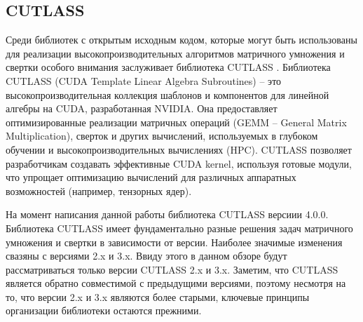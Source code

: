 \subsection{CUTLASS}
Среди библиотек с открытым исходным кодом, которые могут быть использованы для реализации высокопроизводительных алгоритмов матричного умножения
и свертки особого внимания заслуживает библиотека CUTLASS \cite{cutlass_2025}.
Библиотека CUTLASS (CUDA Template Linear Algebra Subroutines) – это высокопроизводительная коллекция шаблонов и компонентов
для линейной алгебры на CUDA, разработанная NVIDIA. Она предоставляет оптимизированные реализации матричных операций
(GEMM – General Matrix Multiplication), сверток и других вычислений, используемых в глубоком обучении и
высокопроизводительных вычислениях (HPC). CU\-TLASS позволяет разработчикам создавать эффективные CUDA kernel,
используя готовые модули, что упрощает оптимизацию вычислений для различных аппаратных возможностей (например, тензорных ядер).

На момент написания данной работы библиотека CUTLASS версиии 4.0.0. Библиотека CUTLASS имеет фундаментально разные решения задач матричного
умножения и свертки в зависимости от версии. Наиболее значимые изменения свазяны с версиями 2.x и 3.x. Ввиду этого в данном обзоре будут рассматриваться
только версии CUTLASS 2.x и 3.x. Заметим, что CUTLASS является обратно совместимой с предыдущими версиями, поэтому несмотря на то, что версии 2.x и 3.x
являются более старыми, ключевые принципы организации библиотеки остаются прежними.

